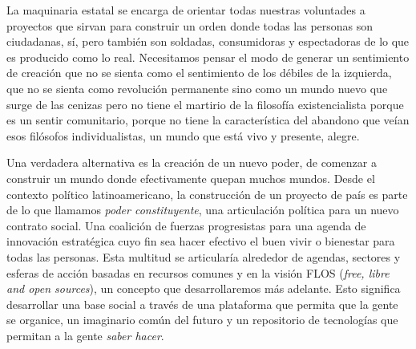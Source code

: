 La maquinaria estatal se encarga de orientar todas nuestras voluntades a proyectos que sirvan para construir un orden donde todas las personas son ciudadanas, sí, pero también son soldadas, consumidoras y espectadoras de lo que es producido como lo real. Necesitamos pensar el modo de generar un sentimiento de creación que no se sienta como el sentimiento de los débiles de la izquierda, que no se sienta como revolución permanente sino como un mundo nuevo que surge de las cenizas pero no tiene el martirio de la filosofía existencialista porque es un sentir comunitario, porque no tiene la característica del abandono que veían esos filósofos individualistas, un mundo que está vivo y presente, alegre.

Una verdadera alternativa es la creación de un nuevo poder, de comenzar a construir un mundo donde efectivamente quepan muchos mundos. Desde el contexto político latinoamericano, la construcción de un proyecto de país es parte de lo que llamamos \emph{poder constituyente}, una articulación política para un nuevo contrato social. Una coalición de fuerzas progresistas para una agenda de innovación estratégica cuyo fin sea hacer efectivo el buen vivir o bienestar para todas las personas. Esta multitud se articularía alrededor de agendas, sectores y esferas de acción basadas en recursos comunes y en la visión FLOS (\emph{free, libre and open sources}), un concepto que desarrollaremos más adelante. Esto significa desarrollar una base social a través de una plataforma que permita que la gente se organice, un imaginario común del futuro y un repositorio de tecnologías que permitan a la gente \emph{saber hacer}.